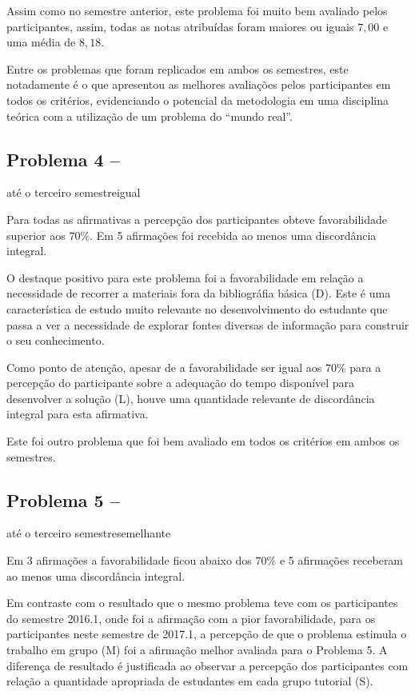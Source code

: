 Assim como no semestre anterior, este problema foi muito bem avaliado
pelos participantes, assim, todas as notas atribuídas foram maiores
ou iguais $7,00$ e uma média de $8,18$.

Entre os problemas que foram replicados em ambos os semestres, este
notadamente é o que apresentou as melhores avaliações pelos participantes
em todos os critérios, evidenciando o potencial da metodologia em uma
disciplina teórica com a utilização de um problema do ``mundo real''.

\subsection{Problema 4 -- \ProblemaD}
{até o terceiro semestre}{igual}

Para todas as afirmativas a percepção dos participantes obteve favorabilidade
superior aos $70\%$. Em 5 afirmações foi recebida ao menos uma discordância
integral.

O destaque positivo para este problema foi a favorabilidade em relação
a necessidade de recorrer a materiais fora da bibliográfia básica (D).
Este é uma característica de estudo muito relevante no desenvolvimento
do estudante que passa a ver a necessidade de explorar fontes diversas
de informação para construir o seu conhecimento.

Como ponto de atenção, apesar de a favorabilidade ser igual aos $70\%$ para
a percepção do participante sobre a adequação do tempo disponível para desenvolver
a solução (L), houve uma quantidade relevante de discordância integral para esta afirmativa.

Este foi outro problema que foi bem avaliado em todos os critérios em ambos
os semestres.

\subsection{Problema 5 -- \ProblemaE}
{até o terceiro semestre}{semelhante}

Em 3 afirmações a favorabilidade ficou abaixo dos $70\%$ e 5 afirmações
receberam ao menos uma discordância integral.

Em contraste com o resultado que o mesmo problema teve com
os participantes do semestre 2016.1, onde foi a afirmação com a
pior favorabilidade, para os participantes neste semestre de
2017.1, a percepção de que o problema estimula o
trabalho em grupo (M) foi a afirmação melhor avaliada
para o Problema 5.
A diferença de resultado é justificada ao observar
a percepção dos participantes com relação a quantidade
apropriada de estudantes em cada grupo tutorial (S).

